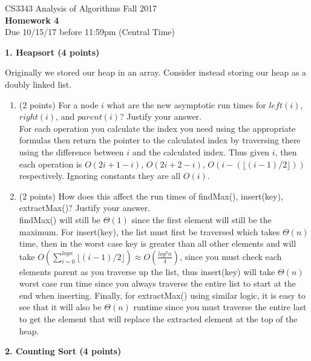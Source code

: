 \documentclass[12pt]{elsart}
\begin{document}
\pagestyle{empty}

\begin{center}
\Large  CS3343 Analysis of Algorithms Fall 2017 \\
\large {\bf Homework 4}\\
\normalsize Due 10/15/17 before 11:59pm (Central Time)
\end{center}

{\bf 1.  Heapsort (4 points)}

Originally we stored our heap in an array.  Consider instead storing our heap as a doubly linked list.  

\begin{enumerate}
   \item (2 points) For a node $i$ what are the new asymptotic run times for  $left(i)$, $right(i)$, and $parent(i)$?  Justify your answer.\\
   For each operation you calculate the index you need using the appropriate formulas then return the pointer to the calculated index by traversing there using the difference between $i$ and the calculated index. Thus given $i$, then each operation is $O(2i + 1 - i)$, $O(2i + 2 - i)$, $O(i - (\lfloor (i - 1) / 2 \rfloor))$ respectively. Ignoring constants they are all $O(i)$.

  \item (2 points) How does this affect the run times of findMax(), insert(key), extractMax()?  Justify your answer.\\
  findMax() will still be $\Theta(1)$ since the first element will still be the maximum. For insert(key), the list must first be traversed which takes $\Theta(n)$ time, then in the worst case key is greater than all other elements and will take $O(\sum\limits_{i=0}^{log n} \lfloor(i-1)/2\rfloor) \approx O(\frac{log^2 n}{4})$, since you must check each elements parent as you traverse up the list, thus insert(key) will take $\Theta(n)$ worst case run time since you always traverse the entire list to start at the end when inserting. Finally, for extractMax() using similar logic, it is easy to see that it will also be $\Theta(n)$ runtime since you must traverse the entire last to get the element that will replace the extracted element at the top of the heap.
\end{enumerate}

{\bf 2.  Counting Sort (4 points)}
\end{document}
